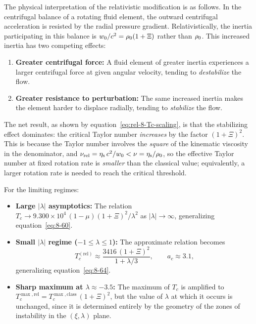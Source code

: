 The physical interpretation of the relativistic modification is as
follows.  In the centrifugal balance of a rotating fluid element, the
outward centrifugal acceleration is resisted by the radial pressure
gradient.  Relativistically, the inertia participating in this balance
is $w_0/c^2 = \rho_0(1+\Xi)$ rather than $\rho_0$.
This increased inertia has two competing effects:
\begin{enumerate}
\item \textbf{Greater centrifugal force:}  A fluid element of greater
  inertia experiences a larger centrifugal force at given angular
  velocity, tending to \emph{destabilize} the flow.
\item \textbf{Greater resistance to perturbation:}  The same increased
  inertia makes the element harder to displace radially, tending to
  \emph{stabilize} the flow.
\end{enumerate}
The net result, as shown by equation~\eqref{eq:rel-8-Tc-scaling},
is that the stabilizing effect dominates: the critical Taylor number
\emph{increases} by the factor $(1+\Xi)^2$.  This is because the
Taylor number involves the \emph{square} of the kinematic viscosity
in the denominator, and $\nu_{\mathrm{rel}} = \eta_{\mathrm{s}}\,c^2/
w_0 < \nu = \eta_{\mathrm{s}}/\rho_0$, so the effective
Taylor number at fixed rotation rate is \emph{smaller} than the
classical value; equivalently, a larger rotation rate is needed
to reach the critical threshold.

For the limiting regimes:
\begin{itemize}
\item \textbf{Large $|\lambda|$ asymptotics:} The relation
  $T_c \to 9.300 \times 10^4\,(1-\mu)(1+\Xi)^2/\lambda^2$
  as $|\lambda| \to \infty$, generalizing equation~\eqref{eq:8-60}.
\item \textbf{Small $|\lambda|$ regime ($-1 \leqslant \lambda
  \leqslant 1$):}  The approximate relation becomes
  \begin{equation}
  \label{eq:rel-8-64}
  T_c^{\mathrm{(rel)}} \approx \frac{3416\,(1+\Xi)^2}{1+\lambda/3},
  \qquad a_c \approx 3.1,
  \end{equation}
  generalizing equation~\eqref{eq:8-64}.
\item \textbf{Sharp maximum at $\lambda \approx -3.5$:}  The maximum
  of $T_c$ is amplified to $T_c^{\max,\mathrm{rel}} =
  T_c^{\max,\mathrm{class}}\,(1+\Xi)^2$, but the value of $\lambda$
  at which it occurs is unchanged, since it is determined entirely by
  the geometry of the zones of instability in the $(\xi,\lambda)$ plane.
\end{itemize}

